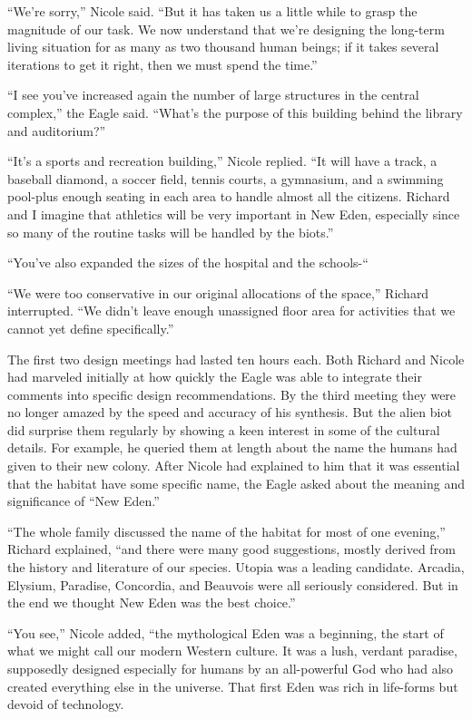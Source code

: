 \documentclass[]{article}
\begin{document}
{“We’re sorry,” Nicole said.  “But it has taken us a little while to grasp the magnitude of our task.  We now understand that we’re designing the long-term living situation for as many as two thousand human beings; if it takes several iterations to get it right, then we must spend the time.”

“I see you’ve increased again the number of large structures in the central complex,” the Eagle said.  “What’s the purpose of this building behind the library and auditorium?”

“It’s a sports and recreation building,” Nicole replied.  “It will have a track, a baseball diamond, a soccer field, tennis courts, a gymnasium, and a swimming pool-plus enough seating in each area to handle almost all the citizens.  Richard and I imagine that athletics will be very important in New Eden, especially since so many of the routine tasks will be handled by the biots.”

“You’ve also expanded the sizes of the hospital and the schools-“

“We were too conservative in our original allocations of the space,” Richard interrupted.  “We didn’t leave enough unassigned floor area for activities that we cannot yet define specifically.”

The first two design meetings had lasted ten hours each.  Both Richard and Nicole had marveled initially at how quickly the Eagle was able to integrate their comments into specific design recommendations.  By the third meeting they were no longer amazed by the speed and accuracy of his synthesis.  But the alien biot did surprise them regularly by showing a keen interest in some of the cultural details.  For example, he queried them at length about the name the humans had given to their new colony.  After Nicole had explained to him that it was essential that the habitat have some specific name, the Eagle asked about the meaning and significance of “New Eden.”

“The whole family discussed the name of the habitat for most of one evening,” Richard explained, “and there were many good suggestions, mostly derived from the history and literature of our species.  Utopia was a leading candidate.  Arcadia, Elysium, Paradise, Concordia, and Beauvois were all seriously considered.  But in the end we thought New Eden was the best choice.”

“You see,” Nicole added, “the mythological Eden was a beginning, the start of what we might call our modern Western culture.  It was a lush, verdant paradise, supposedly designed especially for humans by an all-powerful God who had also created everything else in the universe.  That first Eden was rich in life-forms but devoid of technology.

}
\end{document}
